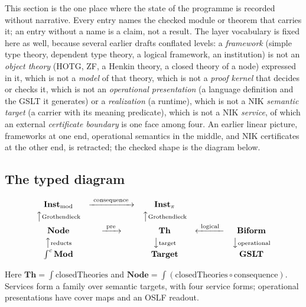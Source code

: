 \documentclass[11pt]{article}
\theoremstyle{definition}
\theoremstyle{remark}
\begin{document}
This section is the one place where the state of the programme is recorded
without narrative.  Every entry names the checked module or theorem that
carries it; an entry without a name is a claim, not a result.  The layer
vocabulary is fixed here as well, because several earlier drafts conflated
levels: a \emph{framework} (simple type theory, dependent type theory, a
logical framework, an institution) is not an \emph{object theory} (HOTG, ZF,
a Henkin theory, a closed theory of a node) expressed in it, which is not a
\emph{model} of that theory, which is not a \emph{proof kernel} that decides
or checks it, which is not an \emph{operational presentation} (a language
definition and the GSLT it generates) or a \emph{realization} (a runtime),
which is not a NIK \emph{semantic target} (a carrier with its meaning
predicate), which is not a NIK \emph{service}, of which an external
\emph{certificate boundary} is one face among four.  An earlier linear
picture, frameworks at one end, operational semantics in the middle, and NIK
certificates at the other end, is retracted; the checked shape is the
diagram below.

\subsection{The typed diagram}

\[
\begin{array}{ccccc}
  \mathbf{Inst}_{\mathrm{mod}}
    & \xrightarrow{\ \text{consequence}\ }
    & \mathbf{Inst}_{\pi}
    & &
  \\[2pt]
  \big\uparrow{\scriptstyle\text{Grothendieck}}
    & &
  \big\uparrow{\scriptstyle\text{Grothendieck}}
    & &
  \\[2pt]
  \mathbf{Node}
    & \xrightarrow{\ \text{pre}\ }
    & \mathbf{Th}
    & \xleftarrow{\ \text{logical}\ }
    & \mathbf{Biform}
  \\[2pt]
  \big\uparrow{\scriptstyle\text{reducts}}
    & &
  \big\downarrow{\scriptstyle\text{target}}
    & &
  \big\downarrow{\scriptstyle\text{operational}}
  \\[2pt]
  \textstyle\int^{c}\mathbf{Mod}
    & &
  \mathbf{Target}
    & &
  \mathbf{GSLT}
\end{array}
\]

Here $\mathbf{Th}=\int\mathrm{closedTheories}$ and
$\mathbf{Node}=\int(\mathrm{closedTheories}\circ\mathrm{consequence})$.
Services form a family over semantic targets, with four service forms;
operational presentations have cover maps and an OSLF readout.
\end{document}
